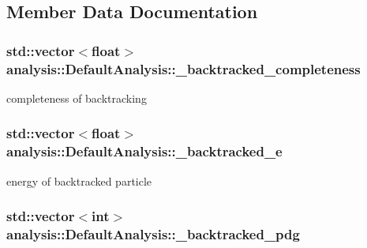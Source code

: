 \subsection{Member Data Documentation}
\hypertarget{classanalysis_1_1DefaultAnalysis_a60ef3ec6e332c118c088e0203fb858d6}{
\subsubsection[{\-\_\-backtracked\-\_\-completeness}]{\setlength{\rightskip}{0pt plus 5cm}std\-::vector$<$float$>$ analysis\-::\-Default\-Analysis\-::\-\_\-backtracked\-\_\-completeness\hspace{0.3cm}{\ttfamily [private]}}}\label{classanalysis_1_1DefaultAnalysis_a60ef3ec6e332c118c088e0203fb858d6}
completeness of backtracking \hypertarget{classanalysis_1_1DefaultAnalysis_a2c16b4988d0bccf8b7ef96a52c173b80}{
\subsubsection[{\-\_\-backtracked\-\_\-e}]{\setlength{\rightskip}{0pt plus 5cm}std\-::vector$<$float$>$ analysis\-::\-Default\-Analysis\-::\-\_\-backtracked\-\_\-e\hspace{0.3cm}{\ttfamily [private]}}}\label{classanalysis_1_1DefaultAnalysis_a2c16b4988d0bccf8b7ef96a52c173b80}
energy of backtracked particle \hypertarget{classanalysis_1_1DefaultAnalysis_a28bd59dce75b8fd3be70bd4996354ae9}{
\subsubsection[{\-\_\-backtracked\-\_\-pdg}]{\setlength{\rightskip}{0pt plus 5cm}std\-::vector$<$int$>$ analysis\-::\-Default\-Analysis\-::\-\_\-backtracked\-\_\-pdg\hspace{0.3cm}{\ttfamily [private]}}}\label{classanalysis_1_1DefaultAnalysis_a28bd59dce75b8fd3be70bd4996354ae9}
